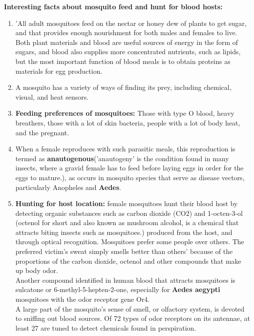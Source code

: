 \documentclass[11pt]{exam}
\begin{document}
\begin{questions}
\textbf{Interesting facts about mosquito feed and hunt for blood hosts:} \\ 
\begin{enumerate}
\item 'All adult mosquitoes feed on the nectar or honey dew of plants to get sugar, and that provides enough nourishment for both males and females to live. %
Both plant materials and blood are useful sources of energy in the form of sugars, and blood also supplies more concentrated nutrients, such as lipids, but the most important function of blood meals is to obtain proteins as materials for egg production.
\item A mosquito has a variety of ways of finding its prey, including chemical, visual, and heat sensors. \\
\item \textbf{Feeding preferences of mosquitoes:} Those with type O blood, heavy breathers, those with a lot of skin bacteria, people with a lot of body heat, and the pregnant.\\
\item When a female reproduces with such parasitic meals, this reproduction is termed as \textbf{anautogenous}('anautogeny' is the condition found in many insects, where a gravid female has to feed before laying eggs in order for the eggs to mature.), as occurs in mosquito species that serve as disease vectors, particularly Anopheles and \textbf{Aedes}.\\
\item \textbf{Hunting for host location:} female mosquitoes hunt their blood host by detecting organic substances such as carbon dioxide (CO2) and 1-octen-3-ol (octenol for short and also known as mushroom alcohol, is a chemical that attracts biting insects such as mosquitoes.) produced from the host, and through optical recognition. Mosquitoes prefer some people over others. The preferred victim's sweat simply smells better than others' because of the proportions of the carbon dioxide, octenol and other compounds that make up body odor. \\
Another compound identified in human blood that attracts mosquitoes is sulcatone or 6-methyl-5-hepten-2-one, especially for \textbf{Aedes aegypti} mosquitoes with the odor receptor gene Or4. \\
A large part of the mosquito’s sense of smell, or olfactory system, is devoted to sniffing out blood sources. Of 72 types of odor receptors on its antennae, at least 27 are tuned to detect chemicals found in perspiration. \\

\end{enumerate}
\end{questions}
\end{document}
